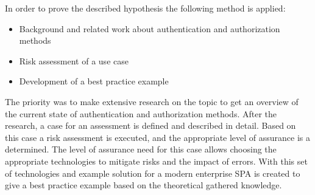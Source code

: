 In order to prove the described hypothesis the following method is applied:

\begin{itemize}
	\item Background and related work about authentication and authorization methods
	\item Risk assessment of a use case
	\item Development of a best practice example
\end{itemize}

The priority was to make extensive research on the topic to get an overview of the current state of authentication and authorization methods. After the research, a case for an assessment is defined and described in detail. Based on this case a risk assessment is executed, and the appropriate level of assurance is a determined. The level of assurance need for this case allows choosing the appropriate technologies to mitigate risks and the impact of errors. With this set of technologies and example solution for a modern enterprise SPA is created to give a best practice example based on the theoretical gathered knowledge.


\chapterend
